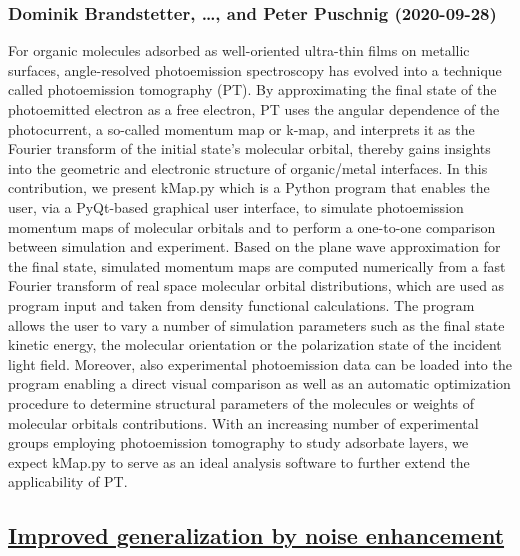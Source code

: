 \subsubsection*{Dominik Brandstetter, \dots, and Peter Puschnig (2020-09-28)}
For organic molecules adsorbed as well-oriented ultra-thin films on metallic
surfaces, angle-resolved photoemission spectroscopy has evolved into a
technique called photoemission tomography (PT). By approximating the final
state of the photoemitted electron as a free electron, PT uses the angular
dependence of the photocurrent, a so-called momentum map or k-map, and
interprets it as the Fourier transform of the initial state's molecular
orbital, thereby gains insights into the geometric and electronic structure of
organic/metal interfaces.
  In this contribution, we present kMap.py which is a Python program that
enables the user, via a PyQt-based graphical user interface, to simulate
photoemission momentum maps of molecular orbitals and to perform a one-to-one
comparison between simulation and experiment. Based on the plane wave
approximation for the final state, simulated momentum maps are computed
numerically from a fast Fourier transform of real space molecular orbital
distributions, which are used as program input and taken from density
functional calculations. The program allows the user to vary a number of
simulation parameters such as the final state kinetic energy, the molecular
orientation or the polarization state of the incident light field. Moreover,
also experimental photoemission data can be loaded into the program enabling a
direct visual comparison as well as an automatic optimization procedure to
determine structural parameters of the molecules or weights of molecular
orbitals contributions. With an increasing number of experimental groups
employing photoemission tomography to study adsorbate layers, we expect kMap.py
to serve as an ideal analysis software to further extend the applicability of
PT.

\subsection*{\href{http://arxiv.org/abs/2009.13094v1}{Improved generalization by noise enhancement}}
